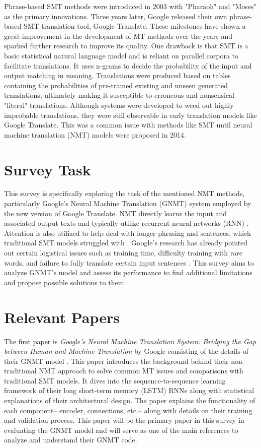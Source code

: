 \documentclass{article}
\begin{document}
Phrase-based SMT methods were introduced in 2003 with "Pharaoh" and "Moses" as the primary innovations. Three years later, Google released their own phrase-based SMT translation tool, Google Translate. These milestones have shown a great improvement in the development of MT methods over the years and sparked further research to improve its quality. \cite{WANG2022143} 
One drawback is that SMT is a basic statistical natural language model and is reliant on parallel corpora to facilitate translations. It uses n-grams to decide the probability of the input and output matching in meaning. Translations were produced based on tables containing the probabilities of pre-trained existing and unseen generated translations, ultimately making it susceptible to erroneous and nonsensical "literal" translations. Although systems were developed to weed out highly improbable translations, they were still observable in early translation models like Google Translate. \cite{SMTTCurriculum} This was a common issue with methods like SMT until neural machine translation (NMT) models were proposed in 2014.

\section{Survey Task}
This survey is specifically exploring the task of the mentioned NMT methods, particularly Google's Neural Machine Translation (GNMT) system employed by the new version of Google Translate. NMT directly learns the input and associated output texts and typically utilize recurrent neural networks (RNN) \cite{SMTTCurriculum}. Attention is also utilized to help deal with longer phrasing and sentences, which traditional SMT models struggled with \cite{wu2016googles}. Google's research has already pointed out certain logistical issues such as training time, difficulty training with rare words, and failure to fully translate certain input sentences \cite{wu2016googles}. This survey aims to analyze GNMT's model and assess its performance to find additional limitations and propose possible solutions to them.

\section{Relevant Papers}
The first paper is \textit{Google's Neural Machine Translation System: Bridging the Gap between Human and Machine Translation} by Google consisting of the details of their GNMT model \cite{wu2016googles}. This paper introduces the background behind their non-traditional NMT approach to solve common MT issues and comparisons with traditional SMT models. It dives into the sequence-to-sequence learning framework of their long short-term memory (LSTM) RNNs along with statistical explanations of their architectural design. The paper explains the functionality of each component-- encoder, connections, etc.-- along with details on their training and validation process. This paper will be the primary paper in this survey in evaluating the GNMT model and will serve as one of the main references to analyze and understand their GNMT code.
\end{document}

